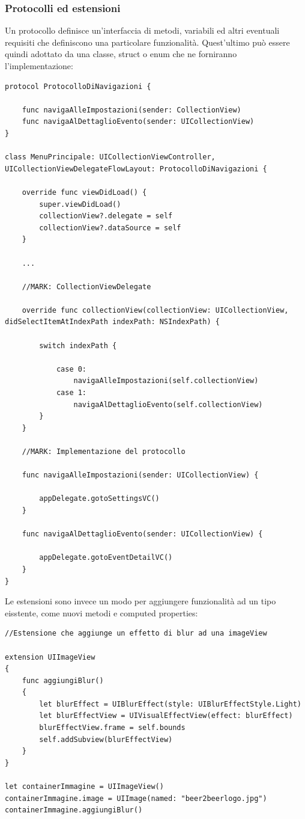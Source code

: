 \subsubsection{Protocolli ed estensioni}
Un protocollo definisce un'interfaccia di metodi, variabili ed altri eventuali requisiti che definiscono una particolare funzionalità. Quest'ultimo può essere quindi adottato da una classe, struct o enum che ne forniranno l'implementazione:
\lstset{language=[Objective]C, breakindent=40pt, breaklines}
\begin{lstlisting}
protocol ProtocolloDiNavigazioni {
	
	func navigaAlleImpostazioni(sender: CollectionView) 
	func navigaAlDettaglioEvento(sender: UICollectionView)
}

class MenuPrincipale: UICollectionViewController, UICollectionViewDelegateFlowLayout: ProtocolloDiNavigazioni {

	override func viewDidLoad() {
        super.viewDidLoad()
		collectionView?.delegate = self
		collectionView?.dataSource = self
	}
	
	...
	
	//MARK: CollectionViewDelegate 
	
	override func collectionView(collectionView: UICollectionView, didSelectItemAtIndexPath indexPath: NSIndexPath) {
		
		switch indexPath {
			
			case 0: 
				navigaAlleImpostazioni(self.collectionView)
			case 1:
				navigaAlDettaglioEvento(self.collectionView)
		}
	}	
		
	//MARK: Implementazione del protocollo 
		
	func navigaAlleImpostazioni(sender: UICollectionView) {
        
        appDelegate.gotoSettingsVC()
    }
    
    func navigaAlDettaglioEvento(sender: UICollectionView) {
        
        appDelegate.gotoEventDetailVC()
    }
}
\end{lstlisting}
Le estensioni sono invece un modo per aggiungere funzionalità ad un tipo eisstente, come nuovi metodi e computed properties:
\lstset{language=[Objective]C, breakindent=40pt, breaklines}
\begin{lstlisting}
//Estensione che aggiunge un effetto di blur ad una imageView

extension UIImageView
{
    func aggiungiBlur()
    {
        let blurEffect = UIBlurEffect(style: UIBlurEffectStyle.Light)
        let blurEffectView = UIVisualEffectView(effect: blurEffect)
        blurEffectView.frame = self.bounds
        self.addSubview(blurEffectView)
    }
}

let containerImmagine = UIImageView()
containerImmagine.image = UIImage(named: "beer2beerlogo.jpg")
containerImmagine.aggiungiBlur()
\end{lstlisting}

